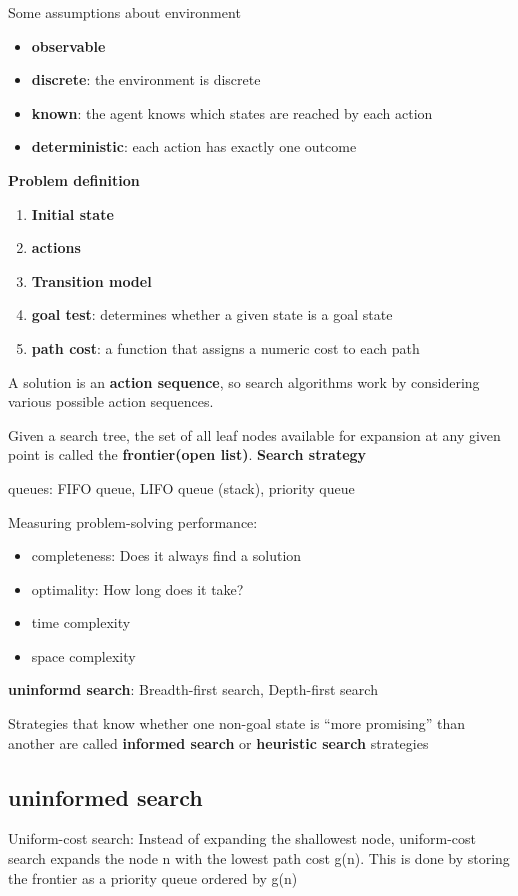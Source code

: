 \documentclass[11pt]{article}
\begin{document}
Some assumptions about environment
\begin{itemize}
\item \textbf{observable}
\item \textbf{discrete}: the environment is discrete
\item \textbf{known}: the agent knows which states are reached by each action
\item \textbf{deterministic}: each action has exactly one outcome
\end{itemize}


\textbf{Problem definition}
\begin{enumerate}
\item \textbf{Initial state}
\item \textbf{actions}
\item \textbf{Transition model}
\item \textbf{goal test}: determines whether a given state is a goal state
\item \textbf{path cost}: a function that assigns a numeric cost to each path
\end{enumerate}


A solution is an \textbf{action sequence}, so search algorithms work
by considering various possible action sequences.


Given a search tree, the set of all leaf nodes available for expansion at any
given point is called the \textbf{frontier(open list)}. \textbf{Search strategy}


queues: FIFO queue, LIFO queue (stack), priority queue


Measuring problem-solving performance: 
\begin{itemize}
\item completeness: Does it always find a solution
\item optimality: How long does it take?
\item time complexity
\item space complexity
\end{itemize}


\textbf{uninformd search}: Breadth-first search, Depth-first search


Strategies that know whether one non-goal state is “more promising” than
another are called \textbf{informed search} or \textbf{heuristic search} strategies

\subsection{uninformed search}
\label{sec:orge28f127}
Uniform-cost search: Instead of expanding the shallowest node, uniform-cost
search expands the node n with the lowest path cost g(n). This is done by
storing the frontier as a priority queue ordered by g(n)
\end{document}
